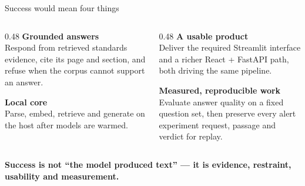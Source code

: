 \documentclass[aspectratio=169,11pt]{beamer}
\newcommand{\keytake}[1]{%
  \vfill
  \noindent\colorbox{accenttint}{%
    \begin{minipage}{\dimexpr\textwidth-2\fboxsep-2\fboxrule\relax}
      \vspace{2pt}
      \small\color{accent}\textbf{#1}
      \vspace{2pt}
    \end{minipage}}\par}
\begin{document}
\begin{frame}{Success would mean four things}
  \begin{columns}[T,onlytextwidth]
    \begin{column}{0.48\textwidth}
      \textbf{\color{accent}Grounded answers}\\[0.25em]
      {\small Respond from retrieved standards evidence, cite its page and section, and
      refuse when the corpus cannot support an answer.}
      \vspace{1.0em}

      \textbf{\color{accent}Local core}\\[0.25em]
      {\small Parse, embed, retrieve and generate on the host after models are warmed.}
    \end{column}
    \begin{column}{0.48\textwidth}
      \textbf{\color{accent}A usable product}\\[0.25em]
      {\small Deliver the required Streamlit interface and a richer React + FastAPI path,
      both driving the same pipeline.}
      \vspace{1.0em}

      \textbf{\color{accent}Measured, reproducible work}\\[0.25em]
      {\small Evaluate answer quality on a fixed question set, then preserve every alert
      experiment request, passage and verdict for replay.}
    \end{column}
  \end{columns}
  \keytake{Success is not ``the model produced text'' --- it is evidence, restraint, usability and measurement.}
\end{frame}
\end{document}

